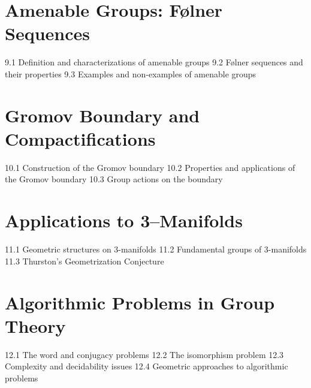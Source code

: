 \section{Amenable Groups: Følner Sequences}
9.1 Definition and characterizations of amenable groups
9.2 Følner sequences and their properties
9.3 Examples and non-examples of amenable groups
\section{Gromov Boundary and Compactifications}
10.1 Construction of the Gromov boundary
10.2 Properties and applications of the Gromov boundary
10.3 Group actions on the boundary
\section{Applications to 3–Manifolds}
11.1 Geometric structures on 3-manifolds
11.2 Fundamental groups of 3-manifolds
11.3 Thurston's Geometrization Conjecture
\section{Algorithmic Problems in Group Theory}
12.1 The word and conjugacy problems
12.2 The isomorphism problem
12.3 Complexity and decidability issues
12.4 Geometric approaches to algorithmic problems
